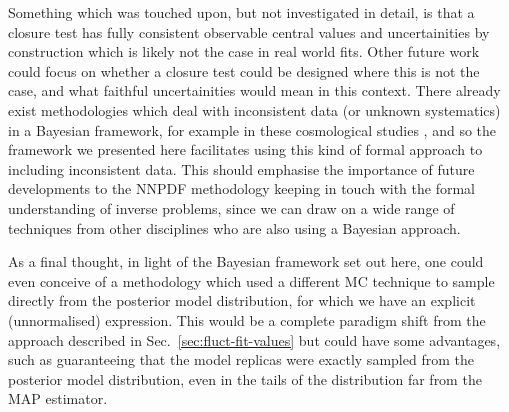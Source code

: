 Something which was touched upon, but not investigated in detail, is that a
closure test has fully consistent observable central values and uncertainities
by construction which is likely not the case in real world fits. Other
future work could focus on whether a closure test could be designed where this
is not the case, and what faithful uncertainities would mean in this context.
There already exist methodologies which deal with inconsistent data (or unknown
systematics) in a Bayesian framework,
for example in these cosmological studies \cite{Luis_Bernal_2018, Hobson_2002},
and so the framework we presented here facilitates using this kind of
formal approach to including inconsistent data. This should emphasise the
importance of future developments to the NNPDF methodology keeping in touch
with the formal understanding of inverse problems, since we can draw on a wide
range of techniques from other disciplines who are also using a Bayesian
approach.

As a final thought, in light of the Bayesian framework set out here, one could
even conceive of a methodology which
used a different MC technique to sample directly from the posterior model
distribution, for which we have an explicit (unnormalised) expression. This
would be a complete paradigm shift from the approach described in
Sec.~\ref{sec:fluct-fit-values} but could have some advantages, such as
guaranteeing that the model replicas were exactly sampled from the posterior
model distribution, even in the tails of the distribution far from the MAP
estimator.
